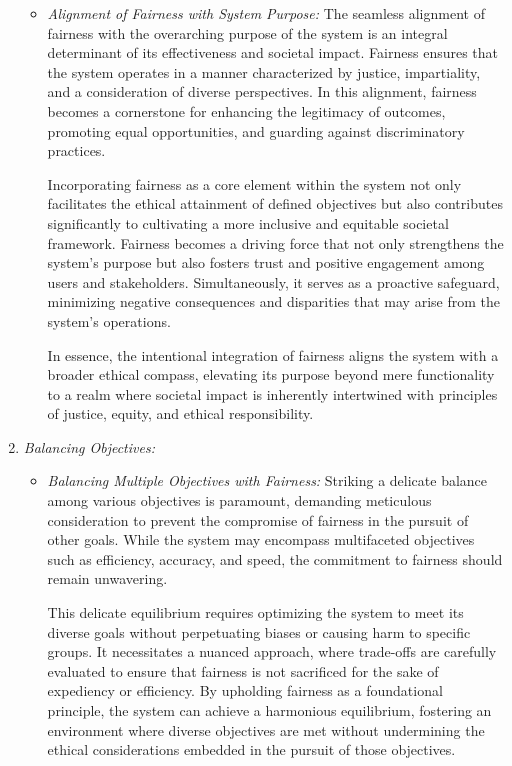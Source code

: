 \begin{enumerate}
\begin{itemize}
            \item \emph{Alignment of Fairness with System Purpose:} The seamless alignment of fairness with the overarching purpose of the system is an integral determinant of its effectiveness and societal impact. Fairness ensures that the system operates in a manner characterized by justice, impartiality, and a consideration of diverse perspectives. In this alignment, fairness becomes a cornerstone for enhancing the legitimacy of outcomes, promoting equal opportunities, and guarding against discriminatory practices.

            Incorporating fairness as a core element within the system not only facilitates the ethical attainment of defined objectives but also contributes significantly to cultivating a more inclusive and equitable societal framework. Fairness becomes a driving force that not only strengthens the system's purpose but also fosters trust and positive engagement among users and stakeholders. Simultaneously, it serves as a proactive safeguard, minimizing negative consequences and disparities that may arise from the system's operations.
            
            In essence, the intentional integration of fairness aligns the system with a broader ethical compass, elevating its purpose beyond mere functionality to a realm where societal impact is inherently intertwined with principles of justice, equity, and ethical responsibility.

        \end{itemize}
    
    \item \emph{Balancing Objectives:}

        \begin{itemize}
            
            \item \emph{Balancing Multiple Objectives with Fairness:} Striking a delicate balance among various objectives is paramount, demanding meticulous consideration to prevent the compromise of fairness in the pursuit of other goals. While the system may encompass multifaceted objectives such as efficiency, accuracy, and speed, the commitment to fairness should remain unwavering.

            This delicate equilibrium requires optimizing the system to meet its diverse goals without perpetuating biases or causing harm to specific groups. It necessitates a nuanced approach, where trade-offs are carefully evaluated to ensure that fairness is not sacrificed for the sake of expediency or efficiency. By upholding fairness as a foundational principle, the system can achieve a harmonious equilibrium, fostering an environment where diverse objectives are met without undermining the ethical considerations embedded in the pursuit of those objectives.


\end{itemize}
\end{enumerate}
